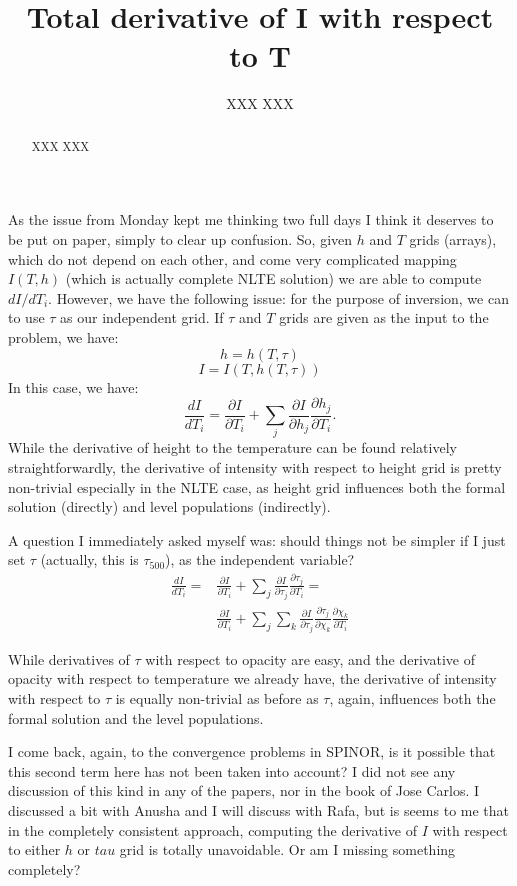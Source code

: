 \documentclass[a4paper,10pt]{article}
\title{Total derivative of I with respect to T}
\author{XXX XXX}
\begin{document}
\maketitle

\begin{abstract}
XXX XXX
\end{abstract}

As the issue from Monday kept me thinking two full days I think it deserves to be put on paper, simply to clear up confusion. So, given $h$ and $T$ grids (arrays), which do not depend on each other, and come very complicated mapping $I(T,h)$ (which is actually complete NLTE solution) we are able to compute $dI / dT_i$. However, we have the following issue: for the purpose of inversion, we can to use $\tau$ as our independent grid. If $\tau$ and $T$ grids are given as the input to the problem, we have:
\begin{equation}
 h = h(T,\tau)
\end{equation}
\begin{equation}
 I=I\left (T, h(T,\tau) \right )
\end{equation}
In this case, we have:
\begin{equation}
 \frac{dI}{dT_i} = \frac{\partial I}{\partial T_i} + \sum_j \frac{\partial I}{\partial h_j} \frac{\partial h_j}{\partial T_i}.
\end{equation}
While the derivative of height to the temperature can be found relatively straightforwardly, the derivative of intensity with respect to height grid is pretty non-trivial especially in the NLTE case, as height grid influences both the formal solution (directly) and level populations (indirectly). 

A question I immediately asked myself was: should things not be simpler if I just set $\tau$ (actually, this is $\tau_{500}$), as the independent variable?
\begin{align}
 \frac{dI}{dT_i} = & \frac{\partial I}{\partial T_i} + \sum_j \frac{\partial I}{\partial \tau_j} \frac{\partial \tau_j}{\partial T_i} = \\
 & \frac{\partial I}{\partial T_i} + \sum_j \sum_k \frac{\partial I}{\partial \tau_j} \frac{\partial \tau_j}{\partial \chi_k} \frac{\partial \chi_k}{\partial T_i} 
\end{align}

While derivatives of $\tau$ with respect to opacity are easy, and the derivative of opacity with respect to temperature we already have, the derivative of intensity with respect to $\tau$ is equally non-trivial as before as $\tau$, again, influences both the formal solution and the level populations. 

I come back, again, to the convergence problems in SPINOR, is it possible that this second term here has not been taken into account? I did not see any discussion of this kind in any of the papers, nor in the book of Jose Carlos. I discussed a bit with Anusha and I will discuss with Rafa, but is seems to me that in the completely consistent approach, computing the derivative of $I$ with respect to either $h$ or $tau$ grid is totally unavoidable. Or am I missing something completely? 
\end{document}

